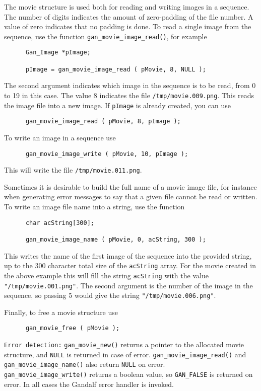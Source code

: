 The movie structure is used both for reading and writing images in a
sequence. The number of digits indicates the amount of zero-padding of
the file number. A value of zero indicates that no padding is done.
To read a single image from the sequence, use the function
{\tt gan\_movie\_image\_read()}, for example
\begin{verbatim}
      Gan_Image *pImage;

      pImage = gan_movie_image_read ( pMovie, 8, NULL );
\end{verbatim}
The second argument indicates which image in the sequence is to be read,
from 0 to 19 in this case. The value 8 indicates the file
{\tt /tmp/movie.009.png}. This reads the image file into a new image.
If {\tt pImage} is already created, you can use
\begin{verbatim}
      gan_movie_image_read ( pMovie, 8, pImage );
\end{verbatim}

To write an image in a sequence use
\begin{verbatim}
      gan_movie_image_write ( pMovie, 10, pImage );
\end{verbatim}
This will write the file {\tt /tmp/movie.011.png}.

Sometimes it is desirable to build the full name of a movie image file,
for instance when generating error messages to say that a given file
cannot be read or written. To write an image file name into a string,
use the function
\begin{verbatim}
      char acString[300];

      gan_movie_image_name ( pMovie, 0, acString, 300 );
\end{verbatim}
This writes the name of the first image of the sequence into the provided
string, up to the 300 character total size of the {\tt acString} array.
For the movie created in the above example this will fill the string
{\tt acString} with the value {\tt "/tmp/movie.001.png"}. The second
argument is the number of the image in the sequence, so passing 5 would
give the string {\tt "/tmp/movie.006.png"}.

Finally, to free a movie structure use
\begin{verbatim}
      gan_movie_free ( pMovie );
\end{verbatim}

{\tt Error detection:} {\tt gan\_movie\_new()} returns a pointer to the
allocated movie structure, and {\tt NULL} is returned in case of error.
{\tt gan\_movie\_image\_read()} and {\tt gan\_movie\_image\_name()} also return
{\tt NULL} on error.\\ {\tt gan\_movie\_image\_write()} returns a boolean
value, so {\tt GAN\_FALSE} is returned on error. In all cases the Gandalf
error handler is invoked.


